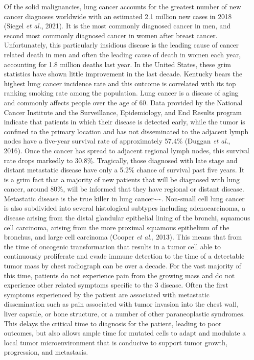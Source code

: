 Of the solid malignancies, lung cancer accounts for the greatest number of new cancer diagnoses worldwide with an estimated 2.1 million new cases in 2018 (Siegel \emph{et al.}, 2021). It is the most commonly diagnosed cancer in men, and second most commonly diagnosed cancer in women after breast cancer. Unfortunately, this particularly insidious disease is the leading cause of cancer related death in men and often the leading cause of death in women each year, accounting for 1.8 million deaths last year. In the United States, these grim statistics have shown little improvement in the last decade. Kentucky bears the highest lung cancer incidence rate and this outcome is correlated with its top ranking smoking rate among the population. Lung cancer is a disease of aging and commonly affects people over the age of 60. Data provided by the National Cancer Institute and the Surveillance, Epidemiology, and End Results program indicate that patients in which their disease is detected early, while the tumor is confined to the primary location and has not disseminated to the adjacent lymph nodes have a five-year survival rate of approximately 57.4\% (Duggan \emph{et al.}, 2016). Once the cancer has spread to adjacent regional lymph nodes, this survival rate drops markedly to 30.8\%. Tragically, those diagnosed with late stage and distant metastatic disease have only a 5.2\% chance of survival past five years. It is a grim fact that a majority of new patients that will be diagnosed with lung cancer, around 80\%, will be informed that they have regional or distant disease. Metastatic disease is the true killer in lung cancer\textasciitilde\textasciitilde. Non-small cell lung cancer is also subdivided into several histological subtypes including adenocarcinoma, a disease arising from the distal glandular epithelial lining of the bronchi, squamous cell carcinoma, arising from the more proximal squamous epithelium of the bronchus, and large cell carcinoma (Cooper \emph{et al.}, 2013). This means that from the time of oncogenic transformation that results in a tumor cell able to continuously proliferate and evade immune detection to the time of a detectable tumor mass by chest radiograph can be over a decade. For the vast majority of this time, patients do not experience pain from the growing mass and do not experience other related symptoms specific to the 3 disease. Often the first symptoms experienced by the patient are associated with metastatic dissemination such as pain associated with tumor invasion into the chest wall, liver capsule, or bone structure, or a number of other paraneoplastic syndromes. This delays the critical time to diagnosis for the patient, leading to poor outcomes, but also allows ample time for mutated cells to adapt and modulate a local tumor microenvironment that is conducive to support tumor growth, progression, and metastasis.

